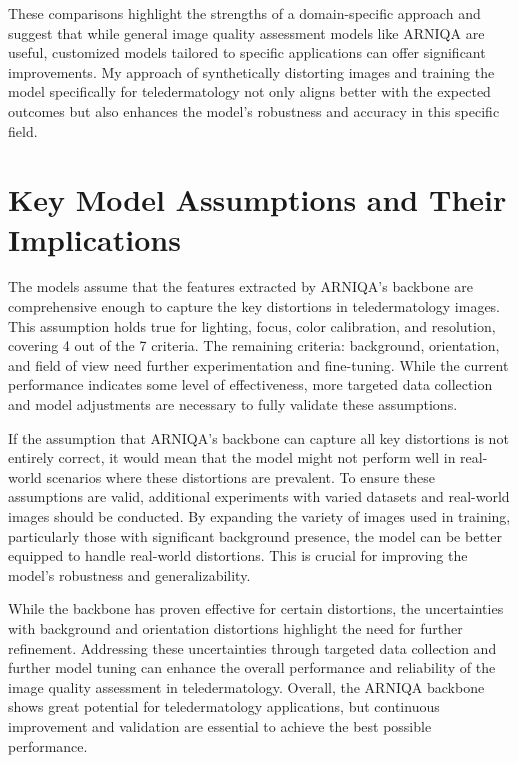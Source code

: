 \noindent
These comparisons highlight the strengths of a domain-specific approach and suggest that while general image quality assessment models like ARNIQA are useful, customized models tailored to specific applications can offer significant improvements. My approach of synthetically distorting images and training the model specifically for teledermatology not only aligns better with the expected outcomes but also enhances the model’s robustness and accuracy in this specific field. \par
\section{Key Model Assumptions and Their Implications}
\label{sec:KeyModelAssumptions}
The models assume that the features extracted by ARNIQA’s backbone are comprehensive enough to capture the key distortions in teledermatology images. This assumption holds true for lighting, focus, color calibration, and resolution, covering 4 out of the 7 criteria. The remaining criteria: background, orientation, and field of view need further experimentation and fine-tuning. While the current performance indicates some level of effectiveness, more targeted data collection and model adjustments are necessary to fully validate these assumptions.\par
\vspace{\baselineskip}
\noindent
If the assumption that ARNIQA’s backbone can capture all key distortions is not entirely correct, it would mean that the model might not perform well in real-world scenarios where these distortions are prevalent. To ensure these assumptions are valid, additional experiments with varied datasets and real-world images should be conducted. By expanding the variety of images used in training, particularly those with significant background presence, the model can be better equipped to handle real-world distortions. This is crucial for improving the model’s robustness and generalizability.\par
\vspace{\baselineskip}
\noindent
While the backbone has proven effective for certain distortions, the uncertainties with background and orientation distortions highlight the need for further refinement. Addressing these uncertainties through targeted data collection and further model tuning can enhance the overall performance and reliability of the image quality assessment in teledermatology. Overall, the ARNIQA backbone shows great potential for teledermatology applications, but continuous improvement and validation are essential to achieve the best possible performance.\par

